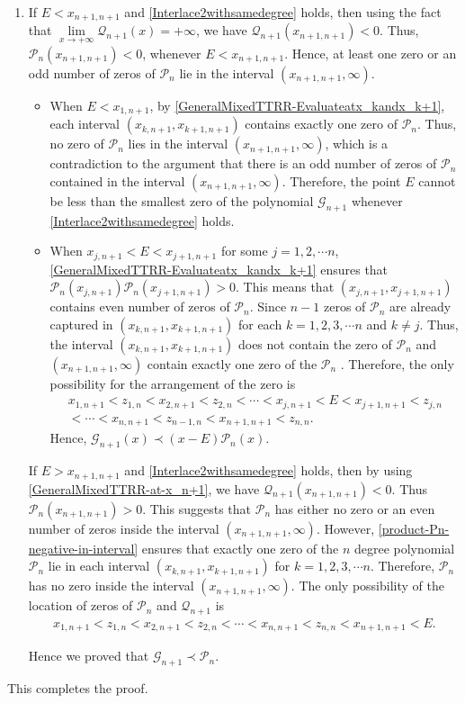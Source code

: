 \documentclass[final,3p,times,12pt]{elsarticle}
\numberwithin{equation}{section}  %
\begin{document}
\begin{enumerate}
	\item If $E < x_{n+1,n+1}$ and \eqref{Interlace2withsamedegree} holds, then using the fact that $\lim\limits_{x\rightarrow +\infty}\mathcal{Q}_{n+1}(x)=+\infty$, we have $\mathcal{Q}_{n+1}(x_{n+1,n+1})<0$. Thus, $\mathcal{P}_n(x_{n+1,n+1})<0$, whenever $E < x_{n+1,n+1}$. Hence, at least one zero or an odd number of zeros of $\mathcal{P}_n$ lie in the interval $(x_{n+1,n+1}, \infty)$.
	\begin{itemize}
		\item When $E<x_{1,n+1}$, by \eqref{GeneralMixedTTRR-Evaluateatx_kandx_k+1}, each interval $(x_{k,n+1},x_{k+1,n+1})$ contains exactly one zero of $\mathcal{P}_n$. Thus, no zero of $\mathcal{P}_n$ lies in the interval $(x_{n+1,n+1}, \infty)$, which is a contradiction to the argument that there is an odd number of zeros of $\mathcal{P}_n$ contained in the interval $(x_{n+1,n+1}, \infty)$. Therefore, the point $E$ cannot be less than the smallest zero of the polynomial $\mathcal{G}_{n+1}$ whenever \eqref{Interlace2withsamedegree} holds. 
		
		\item When $x_{j,n+1}<E< x_{j+1,n+1}$ for some $j=1,2,\cdots n$,  \eqref{GeneralMixedTTRR-Evaluateatx_kandx_k+1} ensures that \newline $\mathcal{P}_n(x_{j,n+1})	\mathcal{P}_n(x_{j+1,n+1})>0$.  This means that  $(x_{j,n+1}, x_{j+1,n+1})$ contains even number of zeros of  $\mathcal{P}_n$. Since $n-1$ zeros of $\mathcal{P}_n$ are already captured in $(x_{k,n+1}, x_{k+1,n+1})$ for each $k=1,2,3, \cdots n$ and $k\neq j$. Thus, the interval $(x_{k,n+1}, x_{k+1,n+1})$  does not contain the zero of $\mathcal{P}_n$ and $(x_{n+1,n+1}, \infty)$ contain exactly one zero of the $\mathcal{P}_n$ . Therefore, the only possibility for the arrangement of the zero is  
		\begin{align}
			\nonumber	x_{1,n+1}<z_{1,n}<x_{2,n+1}<z_{2,n}<\cdots< x_{j,n+1}<E<x_{j+1,n+1}<z_{j,n}
			\\<\cdots<x_{n,n+1}<z_{n-1,n}<x_{n+1,n+1}<z_{n,n}.
		\end{align}
		Hence, $\mathcal{G}_{n+1}(x)\prec(x-E)\mathcal{P}_n(x)$.
	\end{itemize}
	If  $E>x_{n+1,n+1}$ and  \eqref{Interlace2withsamedegree} holds, then by using \eqref{GeneralMixedTTRR-at-x_n+1}, we have  $\mathcal{Q}_{n+1}(x_{n+1,n+1})<0$. Thus $\mathcal{P}_{n}(x_{n+1,n+1})>0$. This suggests that $\mathcal{P}_n$ has either no zero or an even number of zeros inside the interval $(x_{n+1,n+1}, \infty)$. However, \eqref{product-Pn-negative-in-interval} ensures that exactly one zero of the $n$ degree polynomial $\mathcal{P}_n$ lie in each interval $(x_{k,n+1}, x_{k+1,n+1})$ for $k=1,2,3, \cdots n$. Therefore, $\mathcal{P}_n$ has no zero inside the interval $(x_{n+1,n+1}, \infty)$. The only possibility of the location of zeros of $\mathcal{P}_n$ and $\mathcal{Q}_{n+1}$ is 
	\begin{align}
		x_{1,n+1}<z_{1,n}<x_{2,n+1}<z_{2,n}<\cdots<x_{n,n+1}<z_{n,n}<x_{n+1,n+1}<E.
	\end{align}
	
	Hence we proved that $\mathcal{G}_{n+1}\prec \mathcal{P}_n$.
\end{enumerate}This completes the proof.
\end{document}

